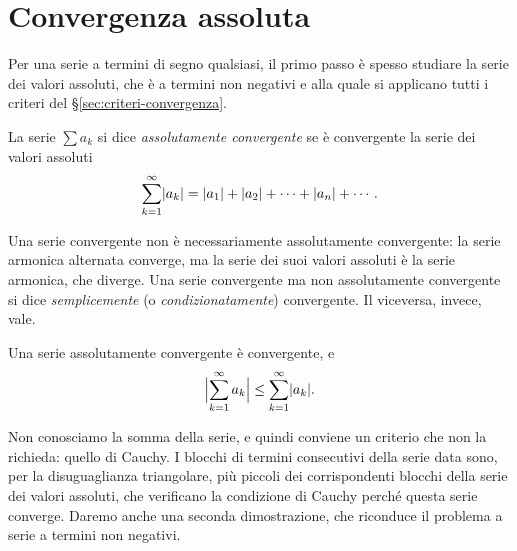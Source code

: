 \section{Convergenza assoluta}
\label{sec:convergenza-assoluta}

Per una serie a termini di segno qualsiasi, il primo passo è spesso studiare la serie
dei valori assoluti, che è a termini non negativi e alla quale si applicano tutti i
criteri del \S\ref{sec:criteri-convergenza}.

\begin{definizione}\label{def:convergenza-assoluta}
La serie $\sum a_{k}$ si dice \emph{assolutamente convergente} se è convergente la serie dei
valori assoluti
\begin{equation}\label{eq:serie-valori-assoluti}
  \sum_{k=1}^{\infty}\lvert a_{k}\rvert=\lvert a_{1}\rvert+\lvert a_{2}\rvert+\dots+\lvert a_{n}\rvert+\cdots .
\end{equation}
\end{definizione}

Una serie convergente non è necessariamente assolutamente convergente: la serie armonica
alternata converge, ma la serie dei suoi valori assoluti è la serie armonica, che
diverge. Una serie convergente ma non assolutamente convergente si dice
\emph{semplicemente} (o \emph{condizionatamente}) convergente. Il viceversa, invece, vale.

\begin{teorema}
\label{teo:convergenza-assoluta}
Una serie assolutamente convergente è convergente, e
\begin{equation}\label{eq:disuguaglianza-serie}
  \Bigl|\sum_{k=1}^{\infty}a_{k}\Bigr|\le\sum_{k=1}^{\infty}\lvert a_{k}\rvert .
\end{equation}
\end{teorema}

\begin{schema}
\end{schema}

\begin{strategia}
Non conosciamo la somma della serie, e quindi conviene un criterio che non la richieda:
quello di Cauchy. I blocchi di termini consecutivi della serie data sono, per la
disuguaglianza triangolare, più piccoli dei corrispondenti blocchi della serie dei valori
assoluti, che verificano la condizione di Cauchy perché questa serie converge. Daremo
anche una seconda dimostrazione, che riconduce il problema a serie a termini non
negativi.
\end{strategia}

